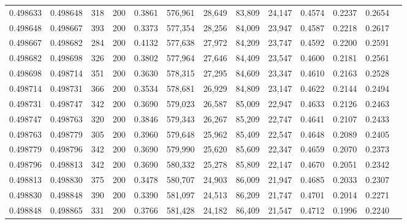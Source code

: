 \begin{tabular}{rrrrrrrrrrrrr}
0.498633 & 0.498648 &    318 & 200 &                                     0.3861 & 576,961 &  28,649 &  83,809 &  24,147 & 0.4574 & 0.2237 & 0.2654 \\
0.498648 & 0.498667 &    393 & 200 &                                     0.3373 & 577,354 &  28,256 &  84,009 &  23,947 & 0.4587 & 0.2218 & 0.2617 \\
0.498667 & 0.498682 &    284 & 200 &                                     0.4132 & 577,638 &  27,972 &  84,209 &  23,747 & 0.4592 & 0.2200 & 0.2591 \\
0.498682 & 0.498698 &    326 & 200 &                                     0.3802 & 577,964 &  27,646 &  84,409 &  23,547 & 0.4600 & 0.2181 & 0.2561 \\
0.498698 & 0.498714 &    351 & 200 &                                     0.3630 & 578,315 &  27,295 &  84,609 &  23,347 & 0.4610 & 0.2163 & 0.2528 \\
0.498714 & 0.498731 &    366 & 200 &                                     0.3534 & 578,681 &  26,929 &  84,809 &  23,147 & 0.4622 & 0.2144 & 0.2494 \\
0.498731 & 0.498747 &    342 & 200 &                                     0.3690 & 579,023 &  26,587 &  85,009 &  22,947 & 0.4633 & 0.2126 & 0.2463 \\
0.498747 & 0.498763 &    320 & 200 &                                     0.3846 & 579,343 &  26,267 &  85,209 &  22,747 & 0.4641 & 0.2107 & 0.2433 \\
0.498763 & 0.498779 &    305 & 200 &                                     0.3960 & 579,648 &  25,962 &  85,409 &  22,547 & 0.4648 & 0.2089 & 0.2405 \\
0.498779 & 0.498796 &    342 & 200 &                                     0.3690 & 579,990 &  25,620 &  85,609 &  22,347 & 0.4659 & 0.2070 & 0.2373 \\
0.498796 & 0.498813 &    342 & 200 &                                     0.3690 & 580,332 &  25,278 &  85,809 &  22,147 & 0.4670 & 0.2051 & 0.2342 \\
0.498813 & 0.498830 &    375 & 200 &                                     0.3478 & 580,707 &  24,903 &  86,009 &  21,947 & 0.4685 & 0.2033 & 0.2307 \\
0.498830 & 0.498848 &    390 & 200 &                                     0.3390 & 581,097 &  24,513 &  86,209 &  21,747 & 0.4701 & 0.2014 & 0.2271 \\
0.498848 & 0.498865 &    331 & 200 &                                     0.3766 & 581,428 &  24,182 &  86,409 &  21,547 & 0.4712 & 0.1996 & 0.2240 \\

\end{tabular}
